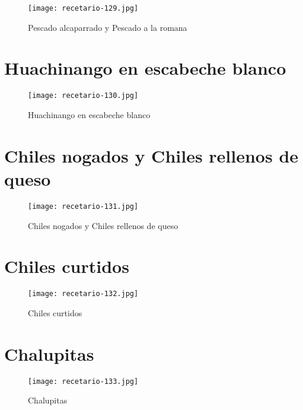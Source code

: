 \documentclass[12pt,letterpaper]{article}
\begin{document}
\newpage


  \begin{figure}[H]
    \vspace{2pt}
  \texttt{[image: recetario-129.jpg]}
    \caption{Pescado alcaparrado y Pescado a la romana}
    
  \end{figure}


\newpage

\section{Huachinango en escabeche blanco}
  \begin{figure}[H]
    \vspace{2pt}
  \texttt{[image: recetario-130.jpg]}
    \caption{Huachinango en escabeche blanco}
    
  \end{figure}

\newpage

\section{Chiles nogados y Chiles rellenos de queso}
  \begin{figure}[H]
    \vspace{2pt}
  \texttt{[image: recetario-131.jpg]}
    \caption{Chiles nogados y Chiles rellenos de queso}
    
  \end{figure}

\newpage

\section{Chiles curtidos}
  \begin{figure}[H]
    \vspace{2pt}
  \texttt{[image: recetario-132.jpg]}
    \caption{Chiles curtidos}
    
  \end{figure}

\newpage

\section{Chalupitas}
  \begin{figure}[H]
    \vspace{2pt}
  \texttt{[image: recetario-133.jpg]}
    \caption{Chalupitas}
    
  \end{figure}
\end{document}
